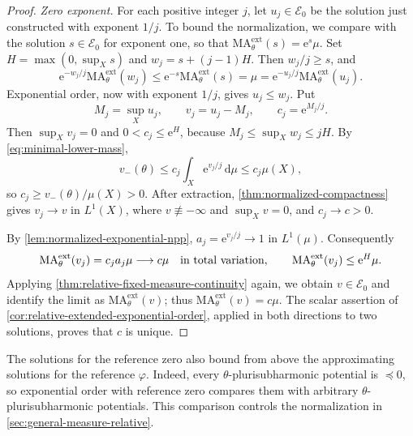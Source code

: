\begin{proof}
\emph{Zero exponent.} For each positive integer $j$, let $u_j\in\mathcal E_0$ be the solution just constructed with exponent $1/j$. To bound the normalization, we compare with the solution $s\in\mathcal E_0$ for exponent one, so that $\mathrm{MA}^{\mathrm{ext}}_\theta(s)=\mathrm{e}^s\mu$. Set $H=\max(0,\sup_Xs)$ and $w_j=s+(j-1)H$. Then $w_j/j\geq s$, and
\[
 \mathrm{e}^{-w_j/j}\mathrm{MA}^{\mathrm{ext}}_\theta(w_j)
 \leq \mathrm{e}^{-s}\mathrm{MA}^{\mathrm{ext}}_\theta(s)
 =\mu
 =\mathrm{e}^{-u_j/j}\mathrm{MA}^{\mathrm{ext}}_\theta(u_j).
\]
Exponential order, now with exponent $1/j$, gives $u_j\leq w_j$. Put
\[
 M_j=\sup_Xu_j,\qquad v_j=u_j-M_j,
 \qquad c_j=\mathrm{e}^{M_j/j}.
\]
Then $\sup_Xv_j=0$ and $0<c_j\leq \mathrm{e}^H$, because $M_j\leq\sup_Xw_j\leq jH$. By \eqref{eq:minimal-lower-mass},
\[
 v_-(\theta)\leq c_j\int_X \mathrm{e}^{v_j/j}\,\mathrm{d}\mu
                 \leq c_j\mu(X),
\]
so $c_j\geq v_-(\theta)/\mu(X)>0$. After extraction, \cref{thm:normalized-compactness} gives $v_j\to v$ in $L^1(X)$, where $v\not\equiv-\infty$ and $\sup_Xv=0$, and $c_j\to c>0$.

By \cref{lem:normalized-exponential-npp}, $a_j=\mathrm{e}^{v_j/j}\to1$ in $L^1(\mu)$. Consequently
\[
 \mathrm{MA}^{\mathrm{ext}}_\theta(v_j)=c_ja_j\mu
       \longrightarrow c\mu
 \quad\hbox{in total variation},\qquad
 \mathrm{MA}^{\mathrm{ext}}_\theta(v_j)\leq \mathrm{e}^H\mu.
\]
Applying \cref{thm:relative-fixed-measure-continuity} again, we obtain $v\in\mathcal E_0$ and identify the limit as $\mathrm{MA}^{\mathrm{ext}}_\theta(v)$; thus $\mathrm{MA}^{\mathrm{ext}}_\theta(v)=c\mu$. The scalar assertion of \cref{cor:relative-extended-exponential-order}, applied in both directions to two solutions, proves that $c$ is unique.
\end{proof}

The solutions for the reference zero also bound from above the approximating solutions for the reference $\varphi$. Indeed, every $\theta$-plurisubharmonic potential is $\preceq0$, so exponential order with reference zero compares them with arbitrary $\theta$-plurisubharmonic potentials. This comparison controls the normalization in \cref{sec:general-measure-relative}.

